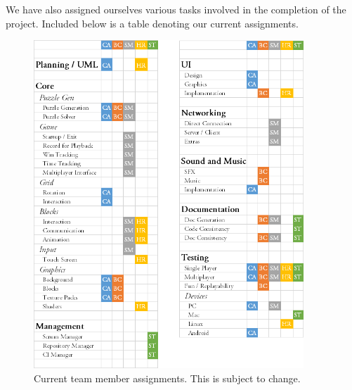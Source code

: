 \documentclass[12pt]{article}
\begin{document}
\clearpage

We have also assigned ourselves various tasks involved in the completion of the project. Included below is a table denoting our current assignments.

    \begin{figure}[H]
        \centering
        \includegraphics[width=4in]{Assignments.png}
        \caption{Current team member assignments. This is subject to change.}
    \end{figure}



\end{document}
